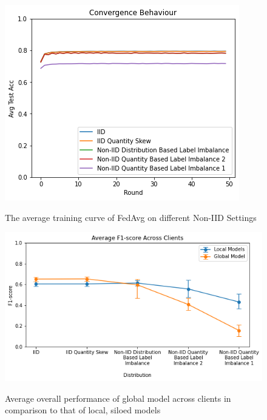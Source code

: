 \documentclass[letterpaper]{article} %
\begin{document}
\begin{figure}[h]
{\includegraphics[width=\columnwidth]{Avg_convergence_behaviour}}
\caption{The average training curve of FedAvg on different Non-IID Settings}
\end{figure}

\begin{figure}[h]
{\includegraphics[width=\columnwidth]{Avg_f1_score_of_local_models_against_that_of_global_model}}
\caption{Average overall performance of global model across clients in comparison to that of local, siloed models}
\end{figure}
\end{document}
